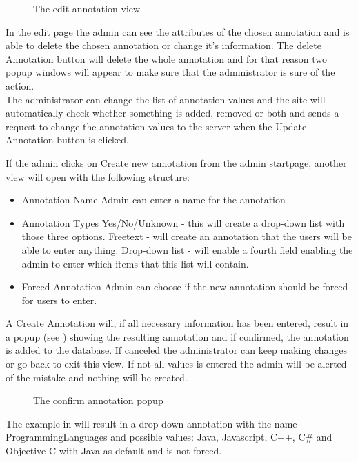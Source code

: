 \begin{figure}[h]
 \caption{The edit annotation view}
 \label{adm_web_editView}
\end{figure}
In the edit page the admin can see the attributes of the chosen annotation and is able to delete the chosen annotation or change it's information.
The delete Annotation button will delete the whole annotation and for that reason two popup windows will appear to make sure that the administrator is sure of the action.\\
The administrator can change the list of annotation values and the site will automatically check whether 
something is added, removed or both and sends a request to change the annotation values to the server when the Update Annotation button is clicked.

If the admin clicks on Create new annotation from the admin startpage, another view will open with the following structure:
\begin{itemize}
 \item Annotation Name
 \subitem Admin can enter a name for the annotation
 
 \item Annotation Types
 \subitem Yes/No/Unknown - this will create a drop-down list with those three options.
 \subitem Freetext - will create an annotation that the users will be able to enter anything.
 \subitem Drop-down list - will enable a fourth field enabling the admin to enter which items that this list will contain.
 
 \item Forced Annotation
 \subitem Admin can choose if the new annotation should be forced for users to enter. 
\end{itemize}

A Create Annotation will, if all necessary information has been entered, result in a popup (see ) showing the resulting annotation and if confirmed, the annotation is added to the database. 
If canceled the administrator can keep making changes or go back to exit this view. If not all values is entered the admin will be alerted of the mistake and nothing will be created.

\begin{figure}[h]
 \caption{The confirm annotation popup}
 \label{adm_web_createPopup}
\end{figure}

The example in  will result in a drop-down annotation with the name ProgrammingLanguages and possible values: Java, Javascript, C++, C\# and Objective-C  with Java as default and is not forced.

